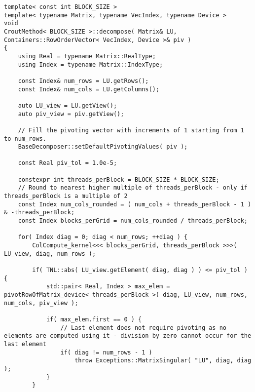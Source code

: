 \begin{lstlisting}[caption={Excerpt from the implementation of PCM\textit{x}PP. The template parameter \code{BLOCK\_SIZE} is equivalent to \textit{x} in PCM\textit{x}PP. On input, matrix \code{LU} is assumed to contain the values of $\mathbf{A}$, and \code{piv} is expected to be appropriately sized. Furthermore, unlike \code{LU}, \code{piv} is assumed to be allocated on the Host. The \code{pivotRowOfMatrix\_device()} function, presented below the \code{decompose()} method, is implemented in the parent class of \code{CroutMethod}: \code{BaseDecomposer}. Note that the code has been slightly modified for brevity. For example, the \code{swapRows\_device()} function has been omitted as it is a basic operation, and the checks for appropriate sizing of matrices/vectors have been removed.},label={Listing:PCMxPP-implementation-excerpt}]
template< const int BLOCK_SIZE >
template< typename Matrix, typename VecIndex, typename Device >
void
CroutMethod< BLOCK_SIZE >::decompose( Matrix& LU, Containers::RowOrderVector< VecIndex, Device >& piv )
{
	using Real = typename Matrix::RealType;
	using Index = typename Matrix::IndexType;
	
	const Index& num_rows = LU.getRows();
	const Index& num_cols = LU.getColumns();
	
	auto LU_view = LU.getView();
	auto piv_view = piv.getView();
	
	// Fill the pivoting vector with increments of 1 starting from 1 to num_rows.
	BaseDecomposer::setDefaultPivotingValues( piv );
	
	const Real piv_tol = 1.0e-5;
	
	constexpr int threads_perBlock = BLOCK_SIZE * BLOCK_SIZE;
	// Round to nearest higher multiple of threads_perBlock - only if threads_perBlock is a multiple of 2
	const Index num_cols_rounded = ( num_cols + threads_perBlock - 1 ) & -threads_perBlock;
	const Index blocks_perGrid = num_cols_rounded / threads_perBlock;
	
	for( Index diag = 0; diag < num_rows; ++diag ) {
		ColCompute_kernel<<< blocks_perGrid, threads_perBlock >>>( LU_view, diag, num_rows );
		
		if( TNL::abs( LU_view.getElement( diag, diag ) ) <= piv_tol ) {
			std::pair< Real, Index > max_elem = pivotRowOfMatrix_device< threads_perBlock >( diag, LU_view, num_rows, num_cols, piv_view );
			
			if( max_elem.first == 0 ) {
				// Last element does not require pivoting as no elements are computed using it - division by zero cannot occur for the last element
				if( diag != num_rows - 1 )
					throw Exceptions::MatrixSingular( "LU", diag, diag );
			}
		}
		

\end{lstlisting}
